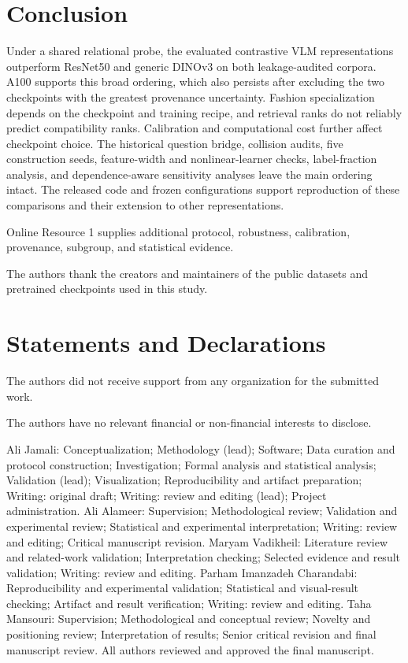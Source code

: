 \documentclass[pdflatex,sn-mathphys-num,iicol]{sn-jnl}
\begin{document}
\section{Conclusion}\label{sec:conclusion}

Under a shared relational probe, the evaluated contrastive VLM representations outperform ResNet50 and generic DINOv3 on both leakage-audited corpora. A100 supports this broad ordering, which also persists after excluding the two checkpoints with the greatest provenance uncertainty. Fashion specialization depends on the checkpoint and training recipe, and retrieval ranks do not reliably predict compatibility ranks. Calibration and computational cost further affect checkpoint choice. The historical question bridge, collision audits, five construction seeds, feature-width and nonlinear-learner checks, label-fraction analysis, and dependence-aware sensitivity analyses leave the main ordering intact. The released code and frozen configurations support reproduction of these comparisons and their extension to other representations.

\backmatter

Online Resource 1 supplies additional protocol, robustness, calibration, provenance, subgroup, and statistical evidence.

The authors thank the creators and maintainers of the public datasets and pretrained checkpoints used in this study.

\section*{Statements and Declarations}

The authors did not receive support from any organization for the submitted work.

The authors have no relevant financial or non-financial interests to disclose.

Ali Jamali: Conceptualization; Methodology (lead); Software; Data curation and protocol construction; Investigation; Formal analysis and statistical analysis; Validation (lead); Visualization; Reproducibility and artifact preparation; Writing: original draft; Writing: review and editing (lead); Project administration. Ali Alameer: Supervision; Methodological review; Validation and experimental review; Statistical and experimental interpretation; Writing: review and editing; Critical manuscript revision. Maryam Vadikheil: Literature review and related-work validation; Interpretation checking; Selected evidence and result validation; Writing: review and editing. Parham Imanzadeh Charandabi: Reproducibility and experimental validation; Statistical and visual-result checking; Artifact and result verification; Writing: review and editing. Taha Mansouri: Supervision; Methodological and conceptual review; Novelty and positioning review; Interpretation of results; Senior critical revision and final manuscript review. All authors reviewed and approved the final manuscript.
\end{document}
